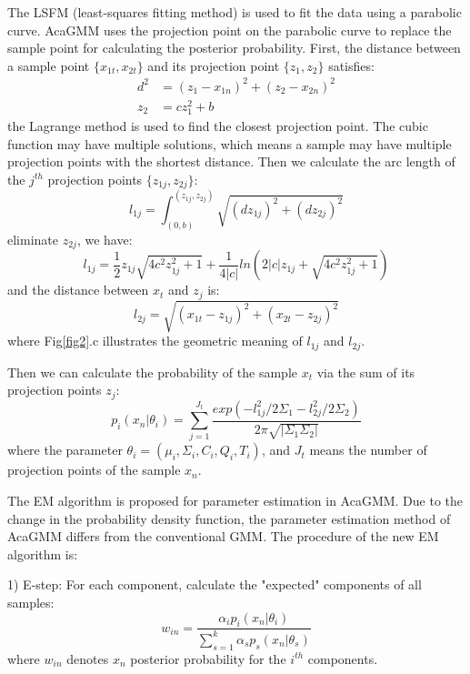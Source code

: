 \documentclass[conference]{IEEEtran}
\begin{document}
The LSFM (least-squares fitting method) is used to fit the data using a parabolic curve. AcaGMM uses the projection point on the parabolic curve to replace the sample point for calculating the posterior probability. First, the distance between a sample point $\{x_{1t},x_{2t}\}$ and its projection point $\{z_{1},z_{2}\}$ satisfies:
\begin{equation}
    \begin{aligned}
        d^2 & =(z_{1}-x_{1n})^2+(z_{2}-x_{2n})^2 \\
        z_2 & =cz_1^2+b
    \end{aligned}
\end{equation}
the Lagrange method is used to find the closest projection point. The cubic function may have multiple solutions, which means a sample may have multiple projection points with the shortest distance. Then we calculate the arc length of the $j^{th}$ projection points $\{z_{1j},z_{2j}\}$:
\begin{equation}
    l_{1j}=\int_{(0,b)}^{(z_{1j},z_{2j})}\sqrt{(dz_{1j})^2+(dz_{2j})^2}
\end{equation}
eliminate $z_{2j}$, we have:
\begin{equation}
    l_{1j}=\frac{1}{2}z_{1j}\sqrt{4c^2z_{1j}^2+1}+\frac{1}{4|c|}ln(2|c|z_{1j}+\sqrt{4c^2z_{1j}^2+1})
\end{equation}
and the distance between $x_t$ and $z_j$ is:
\begin{equation}
    l_{2j}=\sqrt{(x_{1t}-z_{1j})^2+(x_{2t}-z_{2j})^2}
\end{equation}
where Fig\ref{fig2}.c illustrates the geometric meaning of $l_{1j}$ and $l_{2j}$.

Then we can calculate the probability of the sample $x_t$ via the sum of its projection points $z_j$:
\begin{equation}
    p_i(x_n|\theta_i)=\sum\limits^{J_t}_{j=1}\frac{exp(-l_{1j}^2/2\Sigma_1-l_{2j}^2/2\Sigma_2)}{2\pi\sqrt{|\Sigma_1\Sigma_2|}}
\end{equation}
where the parameter $\theta_i=(\mu_i,\Sigma_i,C_i,Q_i,T_i)$, and $J_t$ means the number of projection points of the sample $x_n$.

The EM algorithm is proposed for parameter estimation in AcaGMM. Due to the change in the probability density function, the parameter estimation method of AcaGMM differs from the conventional GMM. The procedure of the new EM algorithm is:

1) E-step: For each component, calculate the "expected" components of all samples:
\begin{equation}
    w_{in}=\frac{\alpha_ip_i(x_n|\theta_i)}{\sum^k_{s=1}\alpha_sp_s(x_n|\theta_s)}
    \label{eq1}
\end{equation}
where $w_{in}$ denotes $x_n$ posterior probability for the $i^{th}$ components.
\end{document}
